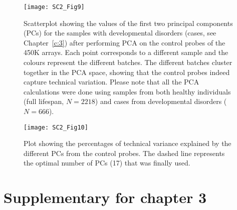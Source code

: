 \begin{figure}[htbp!] 
	\centering    
	\texttt{[image: SC2\_Fig9]}
	\caption[PCA on the array control probes captures batch effects: cases]{Scatterplot showing the values of the first two principal components (PCs) for the samples with developmental disorders (cases, see Chapter~\ref{c:3}) after performing PCA on the control probes of the 450K arrays. Each point corresponds to a different sample and the colours represent the different batches. The different batches cluster together in the PCA space, showing that the control probes indeed capture technical variation. Please note that all the PCA calculations were done using samples from both healthy individuals (full lifespan, $N=2218$) and cases from developmental disorders ($N=666$).}
	\label{fig:sc2_fig9}
\end{figure}

\begin{figure}[htbp!] 
	\vspace*{5mm}
	\centering    
	\texttt{[image: SC2\_Fig10]}
	\caption[Variance explained by the different principal components during batch effect correction]{Plot showing the percentages of technical variance explained by the different PCs from the control probes. The dashed line represents the optimal number of PCs (17) that was finally used.}
	\label{fig:sc2_fig10}
\end{figure}

\clearpage

\renewcommand{\thesection}{S.2}   
\section{Supplementary for chapter 3}

\renewcommand\thefigure{S2.\arabic{figure}}
\renewcommand\thetable{S2.\arabic{table}}        
\vspace{10 mm}

